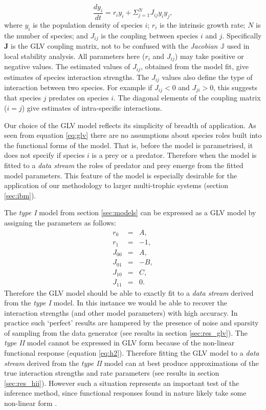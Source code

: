 \begin{equation}
\frac{dy_i}{dt} = r_iy_i + \Sigma_{j=1}^N J_{ij}y_iy_j,
\label{eq:glv}
\end{equation}
%
where $y_i$ is the population density of species $i$; $r_i$ is the intrinsic growth rate; $N$ is the number of species; and $J_{ij}$ is the coupling between species $i$ and $j$. Specifically $\mathbf{J}$ is the GLV coupling matrix, not to be confused with the \emph{Jacobian} $\mathbb{J}$ used in local stability analysis. All parameters here ($r_i$ and $J_{ij}$) may take positive or negative values. The estimated values of $J_{ij}$, obtained from the model fit, give estimates of species interaction strengths. The $J_{ij}$ values also define the type of interaction between two species. For example if $J_{ij} < 0$ and $J_{ji} > 0$, this suggests that species $j$ predates on species $i$. The diagonal elements of the coupling matrix ($i=j$) give estimates of intra-specific interactions.

Our choice of the GLV model reflects its simplicity of breadth of application. As seen from equation \eqref{eq:glv} there are no assumptions about species roles built into the functional forms of the model. That is, before the model is parametrised, it does not specify if species $i$ is a prey or a predator. Therefore when the model is fitted to a \emph{data stream} the roles of predator and prey emerge from the fitted model parameters. This feature of the model is especially desirable for the application of our methodology to larger multi-trophic systems (section \ref{sec:ibm}). 

The \emph{type I} model from section \ref{sec:models} can be expressed as a GLV model by assigning the parameters as follows:
\begin{eqnarray}
r_0 &=& A, \\[10pt]
r_1 &=& -1, \\[10pt]
J_{00} &=& A, \\[10pt]
J_{01} &=& -B, \\[10pt]
J_{10} &=& C, \\[10pt]
J_{11} &=& 0.
\end{eqnarray}
%
Therefore the GLV model should be able to exactly fit to a \emph{data stream} derived from the \emph{type I} model. In this instance we would be able to recover the interaction strengths (and other model parameters) with high accuracy. In practice such `perfect' results are hampered by the presence of noise and sparsity of sampling from the data generator (see results in section \ref{sec:res_glv}). The \emph{type II} model cannot be expressed in GLV form because of the non-linear functional response (equation \eqref{eq:h2}). Therefore fitting the GLV model to a \emph{data stream} derived from the \emph{type II} model can at best produce approximations of the true interaction strengths and rate parameters (see results in section \ref{sec:res_hii}). However such a situation represents an important test of the inference method, since functional responses found in nature likely take some non-linear form \cite{arditi2012species}.  
 
